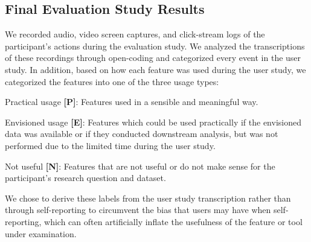 \subsection{Final Evaluation Study Results\label{eval_findings}}
We recorded audio, video screen captures, and click-stream logs of the participant's actions during the evaluation study. We analyzed the transcriptions of these recordings through open-coding and categorized every event in the user study. In addition, based on how each feature was used during the user study, we categorized the features into one of the three usage types:
\begin{denselist}
    \item Practical usage \textbf{[P]}: Features used in a sensible and meaningful way.
    \item Envisioned usage \textbf{[E]}: Features which could be used practically if the envisioned data was available or if they conducted downstream analysis, but was not performed due to the limited time during the user study.
    \item Not useful \textbf{[N]}: Features that are not useful or do not make sense for the participant's research question and dataset.
\end{denselist}
We chose to derive these labels from the user study transcription rather than through self-reporting to circumvent the bias that users may have when self-reporting, which can often artificially inflate the usefulness of the feature or tool under examination.
